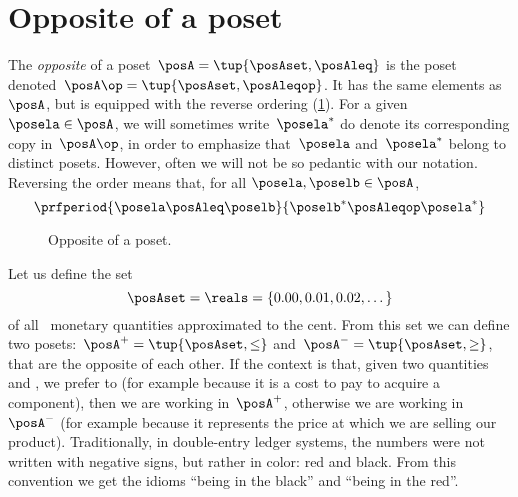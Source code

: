 
\section{Opposite of a poset}\label{sec:opposite-of-a-poset}

\begin{definition}
	\label{def:poset-opposite}
	The \emph{opposite} of a poset~$\posA=\tup{\posAset, \posAleq}$ is the poset denoted~$\posA\op=\tup{\posAset, \posAleqop}$.
	It has the same elements as~$\posA$, but is equipped with the reverse ordering (\cref{fig:poset-opposite}).
	For a given~$\posela \in \posA$, we will sometimes write~$\posela^*$ do denote its corresponding copy in~$\posA\op$, in order to emphasize that~$\posela$ and~$\posela^*$ belong to distinct posets.
	However, often we will not be so pedantic with our notation.
	Reversing the order means that, for all $\posela,\poselb \in \posA$,
	\begin{equation}
		\prfperiod{\posela \posAleq \poselb}{\poselb^* \posAleqop \posela^*}
	\end{equation}
\end{definition}

\begin{figure}[tbh]
	\centering
	\caption{Opposite of a poset.
	}
	\label{fig:poset-opposite}
\end{figure}

\begin{example}
	Let us define the set
	\begin{equation*}
		\posAset=\reals=\{0.00,0.01,0.02,\dots\}
	\end{equation*}
	of all \CHFneutral \ monetary quantities approximated to the cent.
	From this set we can define two posets:~$\posA^{+} = \tup{\posAset, \leq}$ and~$\posA^{-} = \tup{\posAset, \geq}$, that are the opposite of each other.
	If the context is that, given two quantities~\unit[1]{\CHFneutral} and \unit[2]{\CHFneutral}, we prefer \unit[1]{\CHFneutral} to \unit[2]{\CHFneutral} (for example because it is a cost to pay to acquire a component), then we are working in~$\posA^{+}$, otherwise we are working in~$\posA^{-}$ (for example because it represents the price at which we are selling our product).
	Traditionally, in double-entry ledger systems, the numbers were not written with negative signs, but rather in color: red and black.
	From this convention we get the idioms ``being in the black'' and ``being in the red''.
\end{example}